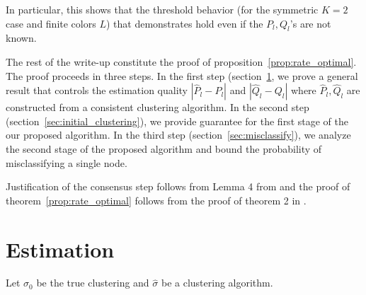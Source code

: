 \documentclass{article}
\begin{document}
In particular, this shows that the threshold behavior (for the symmetric $K=2$ case and finite colors $L$) that \cite{jog2015information} demonstrates hold even if the $P_l, Q_l$'s are not known. 

The rest of the write-up constitute the proof of proposition~\ref{prop:rate_optimal}. The proof proceeds in three steps. In the first step (section~\ref{sec:estimation}, we prove a general result that controls the estimation quality $| \hat{P}_l - P_l |$ and $|\hat{Q}_l - Q_l|$ where $\hat{P}_l, \hat{Q}_l$ are constructed from a consistent clustering algorithm. In the second step (section~\ref{sec:initial_clustering}), we provide guarantee for the first stage of the our proposed algorithm. In the third step (section~\ref{sec:misclassify}), we analyze the second stage of the proposed algorithm and bound the probability of misclassifying a single node.

Justification of the consensus step follows from Lemma 4 from \cite{gao2015achieving} and the proof of theorem~\ref{prop:rate_optimal} follows from the proof of theorem 2 in \cite{gao2015achieving}. 


\section{Estimation}
\label{sec:estimation}

Let $\sigma_0$ be the true clustering and $\hat{\sigma}$ be a clustering algorithm.
\end{document}
